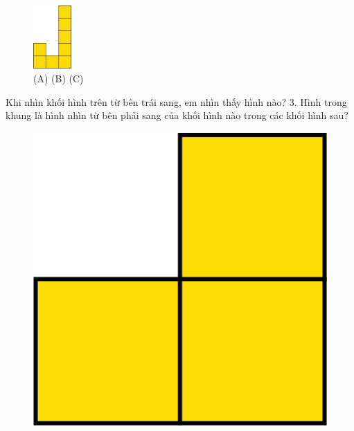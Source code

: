 \begin{multicols}{2}
\begin{figure}[H]
		\includegraphics[width=0.13\textwidth]{7c}
		\caption{{\color[named]{toancuabi}\hspace*{5pt}(A)\hspace*{50pt} (B) \hspace*{35pt}(C)}}
		\vspace*{-5pt}
	\end{figure} 
	\end{multicols}
	Khi nhìn khối hình trên từ {\color[named]{toancuabi}bên trái} sang, em nhìn thấy hình nào?
	\vskip 0.1cm
	$3.$ Hình trong khung là hình nhìn từ {\color[named]{toancuabi}bên phải} sang của khối hình nào trong các khối hình sau?
	\vskip 0.1cm
	\begin{adjustwidth}{0pt}{200pt}
		\begin{thBox}
			\begin{figure}[H]
				\centering
				\vspace*{5pt}
				\captionsetup{labelformat= empty, justification=centering}
				\includegraphics[scale=0.3]{8}
				\vspace*{20pt}
			\end{figure}
		\end{thBox}
	\end{adjustwidth}
